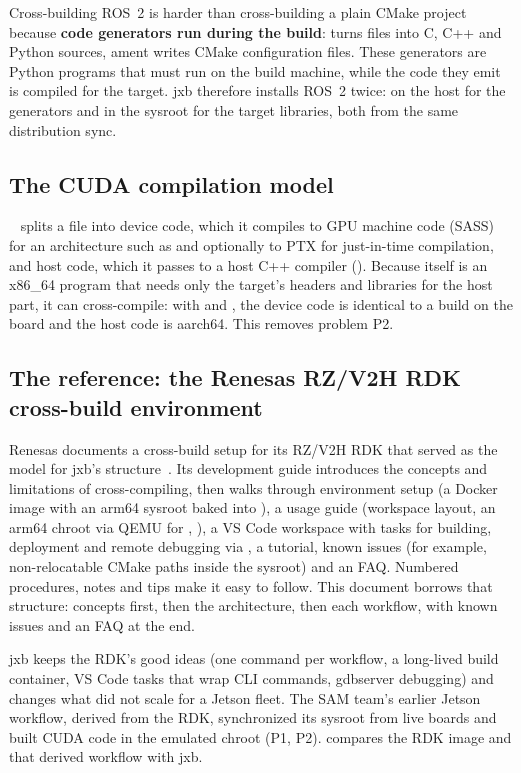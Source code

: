 \documentclass[11pt,a4paper]{article}
\newcommand{\jxb}{\textsf{jxb}}
\begin{document}
Cross-building ROS~2 is harder than cross-building a plain CMake project because \textbf{code generators run during
the build}:  turns  files into C, C++ and Python sources, ament writes CMake configuration
files. These generators are Python programs that must run on the build machine, while the code they emit is
compiled for the target. \jxb{} therefore installs ROS~2 twice: on the host for the generators and in the sysroot
for the target libraries, both from the same distribution sync.

\subsection{The CUDA compilation model}
~\cite{nvcc} splits a  file into device code, which it compiles to GPU machine code (SASS) for
an architecture such as  and optionally to PTX for just-in-time compilation, and host code, which it
passes to a host C++ compiler (). Because  itself is an x86\_64 program that needs only the
target's headers and libraries for the host part, it can cross-compile: with  and
, the device code is identical to a build on the board and the host code is
aarch64. This removes problem P2.

\subsection{The reference: the Renesas RZ/V2H RDK cross-build environment}\label{sec:renesas}
Renesas documents a cross-build setup for its RZ/V2H RDK that served as the model for \jxb's
structure~\cite{renesas-devguide,renesas-setup,renesas-vscode,renesas-faq}. Its development guide introduces the
concepts and limitations of cross-compiling, then walks through environment setup (a Docker image with an arm64
sysroot baked into ), a usage guide (workspace layout, an arm64 chroot via QEMU for
, ), a VS Code workspace with tasks for building, deployment and remote
debugging via , a tutorial, known issues (for example, non-relocatable CMake paths inside the
sysroot) and an FAQ. Numbered procedures, notes and tips make it easy to follow. This document borrows that
structure: concepts first, then the architecture, then each workflow, with known issues and an FAQ at the end.

\jxb{} keeps the RDK's good ideas (one command per workflow, a long-lived build container, VS Code tasks that wrap
CLI commands, gdbserver debugging) and changes what did not scale for a Jetson fleet. The SAM team's earlier Jetson
workflow, derived from the RDK, synchronized its sysroot from live boards and built CUDA code in the emulated chroot
(P1, P2).  compares the RDK image and that derived workflow with \jxb.
\end{document}
